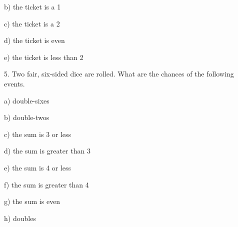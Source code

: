 \documentclass[10pt]{article}
\begin{document}
\hspace{10pt} b) the ticket is a 1
\bigskip

\hspace{10pt} c) the ticket is a 2
\bigskip

\hspace{10pt} d) the ticket is even
\bigskip

\hspace{10pt} e) the ticket is less than 2
\bigskip
\medskip

5. Two fair, six-sided dice are rolled.
What are the chances of the following events.

\hspace{10pt} a) double-sixes
\bigskip
\bigskip

\hspace{10pt} b) double-twos
\bigskip
\bigskip

\hspace{10pt} c) the sum is 3 or less
\bigskip
\bigskip

\hspace{10pt} d) the sum is greater than 3
\bigskip
\bigskip

\hspace{10pt} e) the sum is 4 or less
\bigskip
\bigskip

\hspace{10pt} f) the sum is greater than 4
\bigskip
\bigskip

\hspace{10pt} g) the sum is even
\bigskip
\bigskip

\hspace{10pt} h) doubles
\vfill
\eject
\end{document}
